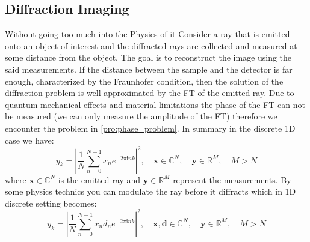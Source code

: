 
\subsection{Diffraction Imaging}\label{sec:diffraction_imaging}

Without going too much into the Physics of it Consider a ray that is emitted onto an object of interest and the diffracted rays are collected and 
measured at some distance from the object. The goal is to reconstruct the image using the said measurements. If the distance between 
the sample and the detector is far enough, characterized by the Fraunhofer condition\cite{Lipson1995}, then the solution of the diffraction 
problem is well approximated by the \ac{FT} of the emitted ray. Due to quantum mechanical effects\cite{DGDS2018}\cite{FranzSchwabl2007} and material limitations\cite{Shechtman2015} 
the phase of the \ac{FT} can not be measured (we can only measure the amplitude of the \ac{FT}) therefore we encounter the \pp problem in \cref{pro:phase_problem}. 
In summary in the discrete 1D case we have:
\begin{equation}
	y_k = \left| \frac{1}{N}\sum_{n=0}^{N-1} x_n e^{-2\pi\mathrm{i}nk} \right|^2 , \quad \boldsymbol{x} \in \mathbb{C}^N , \quad \boldsymbol{y} \in \mathbb{R}^M, \quad M > N 
\end{equation}
where $\boldsymbol{x} \in \mathbb{C}^N$ is the emitted ray and $\boldsymbol{y} \in \mathbb{R}^M$ represent the measurements. By some physics technics\cite{Loewen2018}\cite{Candes2011} you can modulate 
the ray before it diffracts which in 1D discrete setting becomes:
\begin{equation}\label{eq:modulation_effect}
	y_k = \left| \frac{1}{N}\sum_{n=0}^{N-1} x_n\overline{d_n} e^{-2\pi\mathrm{i}nk} \right|^2 , \quad \boldsymbol{x}, \boldsymbol{d} \in \mathbb{C}^N , \quad \boldsymbol{y} \in \mathbb{R}^M, \quad M > N 
\end{equation}

